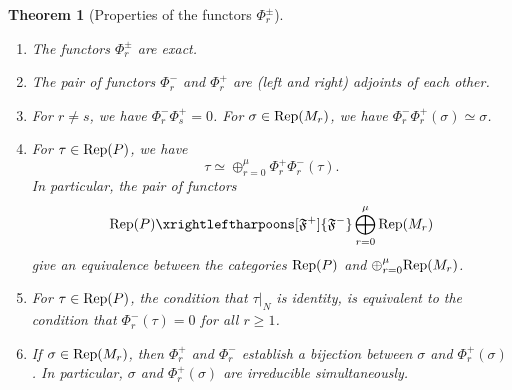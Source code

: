 \documentclass[reqno]{amsart}
\newtheorem{theorem}{Theorem}[section]
\theoremstyle{definition}
\theoremstyle{remark}
\numberwithin{equation}{section}
\newcommand{\fF}{\mathfrak F}
\begin{document}
\begin{theorem} [Properties of the functors $\Phi_r^{\pm}$] \label{Phi+-_properties}  \hfill
\begin{enumerate} [label=\alph*)]
\item[\emph{(a)}] The functors $\Phi_r^{\pm}$ are exact. 
\item[\emph{(b)}] The pair of functors $\Phi_r^-$ and $\Phi_r^+$ are (left and right) adjoints of each other.
\item[\emph{(c)}]  For $r \neq s$, we have $\Phi_r^- \Phi_s^+=0$. For $\sigma \in {\rm Rep}(M_r)$, we have $\Phi_r^- \Phi_r^+(\sigma) \simeq \sigma$.
\item[\emph{(d)}] For $\tau \in {\rm Rep}(P)$, we have 
        \[ \tau \simeq \oplus_{r=0}^\mu \Phi_r^+ \Phi_r^-(\tau).\]
In particular, the pair of functors 
\[ {\rm Rep}(P) \xrightleftharpoons[\fF^+]{\fF^-}\bigoplus_{r=0}^\mu {\rm Rep}(M_r)\]
give an equivalence between the categories ${\rm Rep}(P)$ and $\oplus_{r=0}^\mu {\rm Rep}(M_r)$.\\
\item[\emph{(e)}] For $\tau \in {\rm Rep}(P)$,  the condition that $\tau|_N$ is identity, is equivalent to the condition that $\Phi_r^-(\tau)=0$ for all $r \geq 1$.\\
\item[\emph{(f)}] If $\sigma \in {\rm Rep}(M_r)$, then $\Phi_r^+$  and $\Phi_r^-$  establish a bijection between $\sigma$ and $\Phi_r^+(\sigma)$. In particular, $\sigma$  and $\Phi_r^+(\sigma)$  are irreducible simultaneously. 
\end{enumerate}
\end{theorem}
\end{document}
